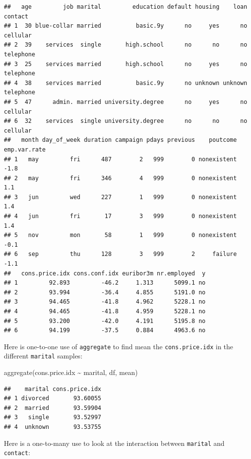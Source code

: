 \documentclass[
]{book}
\newenvironment{Shaded}{\begin{snugshade}}{\end{snugshade}}
\newcommand{\FunctionTok}[1]{\textcolor[rgb]{0.00,0.00,0.00}{#1}}
\newcommand{\NormalTok}[1]{#1}
\newcommand{\SpecialCharTok}[1]{\textcolor[rgb]{0.00,0.00,0.00}{#1}}
\theoremstyle{definition}
\theoremstyle{definition}
\theoremstyle{definition}
\theoremstyle{definition}
\theoremstyle{remark}
\begin{document}
\begin{verbatim}
##   age         job marital         education default housing    loan   contact
## 1  30 blue-collar married          basic.9y      no     yes      no  cellular
## 2  39    services  single       high.school      no      no      no telephone
## 3  25    services married       high.school      no     yes      no telephone
## 4  38    services married          basic.9y      no unknown unknown telephone
## 5  47      admin. married university.degree      no     yes      no  cellular
## 6  32    services  single university.degree      no      no      no  cellular
##   month day_of_week duration campaign pdays previous    poutcome emp.var.rate
## 1   may         fri      487        2   999        0 nonexistent         -1.8
## 2   may         fri      346        4   999        0 nonexistent          1.1
## 3   jun         wed      227        1   999        0 nonexistent          1.4
## 4   jun         fri       17        3   999        0 nonexistent          1.4
## 5   nov         mon       58        1   999        0 nonexistent         -0.1
## 6   sep         thu      128        3   999        2     failure         -1.1
##   cons.price.idx cons.conf.idx euribor3m nr.employed  y
## 1         92.893         -46.2     1.313      5099.1 no
## 2         93.994         -36.4     4.855      5191.0 no
## 3         94.465         -41.8     4.962      5228.1 no
## 4         94.465         -41.8     4.959      5228.1 no
## 5         93.200         -42.0     4.191      5195.8 no
## 6         94.199         -37.5     0.884      4963.6 no
\end{verbatim}

Here is one-to-one use of \texttt{aggregate} to find mean the \texttt{cons.price.idx} in the different \texttt{marital} samples:

\begin{Shaded}
\begin{Highlighting}[]
\FunctionTok{aggregate}\NormalTok{(cons.price.idx }\SpecialCharTok{\textasciitilde{}}\NormalTok{ marital, df, mean)}
\end{Highlighting}
\end{Shaded}

\begin{verbatim}
##    marital cons.price.idx
## 1 divorced       93.60055
## 2  married       93.59904
## 3   single       93.52997
## 4  unknown       93.53755
\end{verbatim}

Here is a one-to-many use to look at the interaction between \texttt{marital} and \texttt{contact}:
\end{document}
